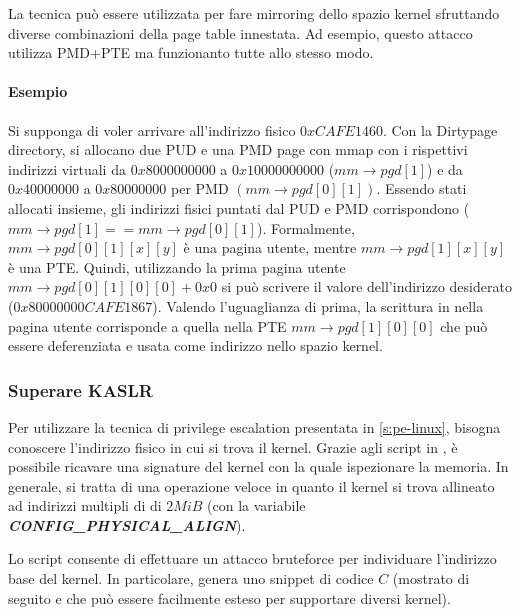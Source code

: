 \documentclass{article}
\begin{document}
La tecnica può essere utilizzata per fare mirroring dello spazio kernel sfruttando 
diverse combinazioni della page table innestata. Ad esempio, questo attacco utilizza PMD+PTE 
ma funzionanto tutte allo stesso modo. 

\paragraph{Esempio}
Si supponga di voler arrivare all'indirizzo fisico $0xCAFE1460$. 
Con la Dirtypage directory, si allocano due PUD e una PMD page con mmap con i rispettivi 
indirizzi virtuali da $0x8000000000$ a $0x10000000000$ ($mm\to pgd[1]$) e da $0x40000000$ a
$0x80000000$ per PMD $(mm\to pgd[0][1])$. Essendo stati allocati insieme, 
gli indirizzi fisici puntati dal PUD e PMD corrispondono ($mm \to pgd[1] == mm \to pgd[0][1]$). 
Formalmente, $mm\to pgd[0][1][x][y]$ è una pagina utente, mentre $mm\to pgd[1][x][y]$ è una 
PTE. Quindi, utilizzando la prima pagina utente $mm\to pgd[0][1][0][0]+0x0$ si può 
scrivere il valore dell'indirizzo desiderato ($0x80000000CAFE1867$). Valendo l'uguaglianza di 
prima, la scrittura in nella pagina utente corrisponde a quella nella PTE 
$mm\to pgd[1][0][0]$ che può essere deferenziata e usata come indirizzo nello spazio kernel.

\subsubsection{Superare KASLR}
Per utilizzare la tecnica di privilege escalation presentata in \cref{s:pe-linux}, 
bisogna conoscere l'indirizzo fisico in cui si trova il kernel. Grazie agli script in 
\cite{KernelSig}, è possibile ricavare una signature del kernel con la quale ispezionare 
la memoria. In generale, si tratta di una operazione veloce in quanto il kernel si trova 
allineato ad indirizzi multipli di di $2MiB$ (con la variabile \textbf{\textit{CONFIG\_PHYSICAL\_ALIGN}}). 

Lo script consente di effettuare un attacco bruteforce per individuare l'indirizzo base del 
kernel. In particolare, genera uno snippet di codice $C$ (mostrato di seguito e che può
essere facilmente esteso per supportare diversi kernel). 
\end{document}
